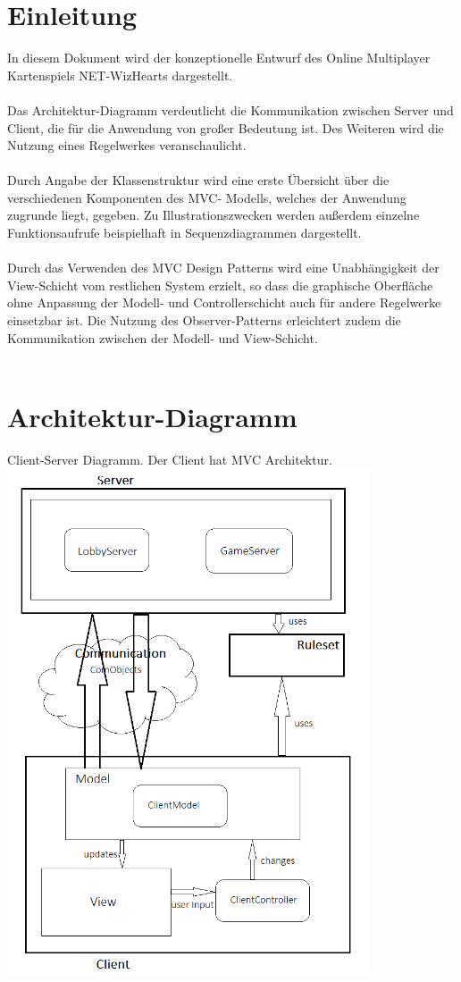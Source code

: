 \documentclass{article}
\begin{document}
\tableofcontents
\newpage

\section{Einleitung}
In diesem Dokument wird der konzeptionelle Entwurf des Online Multiplayer Kartenspiels NET-WizHearts dargestellt.\\
\ \\
Das Architektur-Diagramm verdeutlicht die Kommunikation zwischen Server und Client, die für die Anwendung von großer 
Bedeutung ist. Des Weiteren wird die Nutzung eines Regelwerkes veranschaulicht.\\
\ \\
Durch Angabe der Klassenstruktur wird eine erste Übersicht über die verschiedenen Komponenten des MVC-
Modells, welches der Anwendung zugrunde liegt, gegeben. Zu Illustrationszwecken werden außerdem einzelne Funktionsaufrufe
beispielhaft in Sequenzdiagrammen dargestellt.\\
\ \\
Durch das Verwenden des MVC Design Patterns wird eine Unabhängigkeit der View-Schicht 
vom restlichen System erzielt, so dass die graphische Oberfläche ohne Anpassung 
der Modell- und Controllerschicht auch für andere Regelwerke einsetzbar ist. Die Nutzung des Observer-Patterns erleichtert zudem
die Kommunikation zwischen der Modell- und View-Schicht.\\
\  \\



\section{Architektur-Diagramm}
Client-Server Diagramm. Der Client hat MVC Architektur.
\  \\
\includegraphics[height=15cm]{ArchitekturDiagramm}
\newpage
\end{document}
